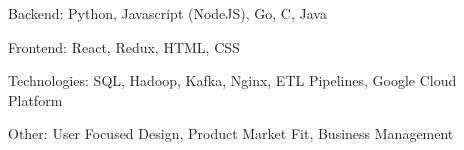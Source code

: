

\begin{cventries}

    \begin{cvitems} %
        \item {Backend: 
        Python,
        Javascript (NodeJS),
        Go,
        C,
        Java}
        \item{
        Frontend:
        React,
        Redux,
        HTML,
        CSS}
        \item{
        Technologies: 
        SQL,
	    Hadoop,
        Kafka,
        Nginx,
	    ETL Pipelines,
	    Google Cloud Platform
        }
        \item{
        Other:
        User Focused Design,
        Product Market Fit,
        Business Management
        }
      \end{cvitems}
\end{cventries}
